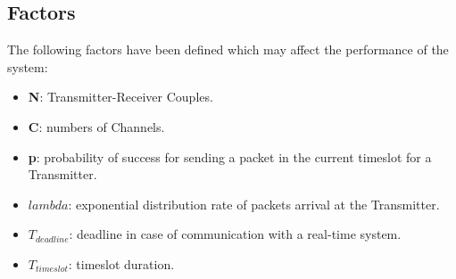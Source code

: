 \subsection{Factors}
The following factors have been defined which may affect the performance of the system:
\begin{itemize}
	\item \textbf{N}: Transmitter-Receiver Couples.
	\item \textbf{C}: numbers of Channels.
	\item \textbf{p}: probability of success for sending a packet in the current timeslot for a Transmitter.
	\item \textbf{$lambda$}: exponential distribution rate of packets arrival at the Transmitter.
	\item $T_{deadline}$: deadline in case of communication with a real-time system.
	\item $T_{timeslot}$: timeslot duration. 
\end{itemize}